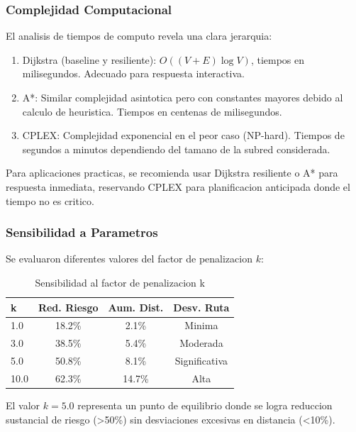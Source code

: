 \documentclass[conference]{IEEEtran}
\begin{document}
\subsubsection{Complejidad Computacional}

El analisis de tiempos de computo revela una clara jerarquia:

\begin{enumerate}
    \item Dijkstra (baseline y resiliente): $O((V+E)\log V)$, tiempos en milisegundos. Adecuado para respuesta interactiva.

    \item A*: Similar complejidad asintotica pero con constantes mayores debido al calculo de heuristica. Tiempos en centenas de milisegundos.

    \item CPLEX: Complejidad exponencial en el peor caso (NP-hard). Tiempos de segundos a minutos dependiendo del tamano de la subred considerada.
\end{enumerate}

Para aplicaciones practicas, se recomienda usar Dijkstra resiliente o A* para respuesta inmediata, reservando CPLEX para planificacion anticipada donde el tiempo no es critico.

\subsubsection{Sensibilidad a Parametros}

Se evaluaron diferentes valores del factor de penalizacion $k$:

\begin{table}[!t]
\centering
\caption{Sensibilidad al factor de penalizacion k}
\begin{tabular}{@{}lccc@{}}
\toprule
\textbf{k} & \textbf{Red. Riesgo} & \textbf{Aum. Dist.} & \textbf{Desv. Ruta} \\
\midrule
1.0 & 18.2\% & 2.1\% & Minima \\
3.0 & 38.5\% & 5.4\% & Moderada \\
5.0 & 50.8\% & 8.1\% & Significativa \\
10.0 & 62.3\% & 14.7\% & Alta \\
\bottomrule
\end{tabular}
\end{table}

El valor $k = 5.0$ representa un punto de equilibrio donde se logra reduccion sustancial de riesgo (>50\%) sin desviaciones excesivas en distancia (<10\%).
\end{document}
